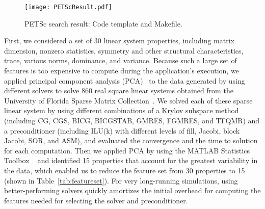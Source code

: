 \documentclass{sig-alternate}
\begin{document}
\begin{figure}[htb]
\centering
\texttt{[image: PETScResult.pdf]}
\vspace{-5pt}
\caption{PETSc search result: Code template and Makefile.}
\label{fig:makefile}
\end{figure}



First, we considered a set of 30 linear system properties, including 
matrix dimension, nonzero statistics, symmetry and other structural characteristics, trace, various norms, dominance, and variance. Because such 
a large set of features is too expensive to compute during the application's execution, we applied principal component analysis 
(PCA)~\cite{pca:Online} to the  data generated by using different solvers to solve 860 real square linear systems
obtained from the University of Florida Sparse Matrix Collection~\cite{UofF:Online}. We solved each of these sparse linear system by using
different combinations of a Krylov subspace method (including CG, CGS, BICG, BICGSTAB, GMRES, FGMRES, and TFQMR)
and a preconditioner (including ILU(k) with different levels of fill, Jacobi, block Jacobi, SOR, and ASM), 
and evaluated the convergence and the time to solution for each
computation. 
Then we applied PCA by using the MATLAB Statistics Toolbox
~\cite{MATLABstats} 
and identified 15 properties that account for the greatest variability in the data, which enabled us to reduce the feature set from 30 properties to 15 
(shown in Table~\ref{tab:featureset}). For very long-running simulations, using better-performing solvers quickly amortizes the initial 
overhead for computing the features needed for selecting the solver and preconditioner.
\end{document}
